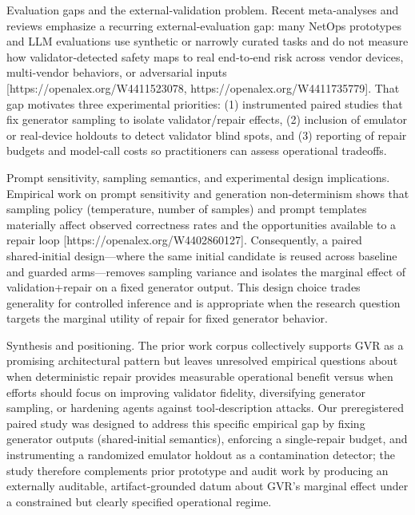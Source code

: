 \documentclass[conference]{IEEEtran}
\begin{document}
Evaluation gaps and the external‑validation problem. Recent meta‑analyses and reviews emphasize a recurring external‑evaluation gap: many NetOps prototypes and LLM evaluations use synthetic or narrowly curated tasks and do not measure how validator‑detected safety maps to real end‑to‑end risk across vendor devices, multi‑vendor behaviors, or adversarial inputs [https://openalex.org/W4411523078, https://openalex.org/W4411735779]. That gap motivates three experimental priorities: (1) instrumented paired studies that fix generator sampling to isolate validator/repair effects, (2) inclusion of emulator or real‑device holdouts to detect validator blind spots, and (3) reporting of repair budgets and model‑call costs so practitioners can assess operational tradeoffs.

Prompt sensitivity, sampling semantics, and experimental design implications. Empirical work on prompt sensitivity and generation non‑determinism shows that sampling policy (temperature, number of samples) and prompt templates materially affect observed correctness rates and the opportunities available to a repair loop [https://openalex.org/W4402860127]. Consequently, a paired shared‑initial design---where the same initial candidate is reused across baseline and guarded arms---removes sampling variance and isolates the marginal effect of validation+repair on a fixed generator output. This design choice trades generality for controlled inference and is appropriate when the research question targets the marginal utility of repair for fixed generator behavior.

Synthesis and positioning. The prior work corpus collectively supports GVR as a promising architectural pattern but leaves unresolved empirical questions about when deterministic repair provides measurable operational benefit versus when efforts should focus on improving validator fidelity, diversifying generator sampling, or hardening agents against tool‑description attacks. Our preregistered paired study was designed to address this specific empirical gap by fixing generator outputs (shared‑initial semantics), enforcing a single‑repair budget, and instrumenting a randomized emulator holdout as a contamination detector; the study therefore complements prior prototype and audit work by producing an externally auditable, artifact‑grounded datum about GVR's marginal effect under a constrained but clearly specified operational regime.
\end{document}
